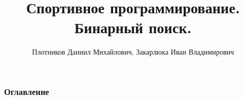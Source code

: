 \documentclass[
	11pt
	   t,
	aspectratio=169
]{beamer}
\title[Бинарный поиск]{Спортивное программирование. Бинарный поиск.}
\author[Потников Д.М., Закарлюка И.В. ]{Плотников Даниил Михайлович, Закарлюка Иван Владимирович}
\institute[СПбГУ]{Санкт-Петербургский Государственный Университет}
\date[2025]{}
\begin{document}
\begin{frame}
	\titlepage
\end{frame}

\begin{frame}
	\frametitle{Оглавление}
	\tableofcontents 
\end{frame}





\end{document}
